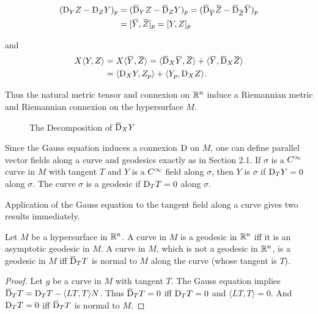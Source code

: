 \documentclass[../main]{subfiles}
\begin{document}
\[
\begin{aligned}
(\connection_Y Z - \connection_Z Y)_p &= (\covariant_Y Z-\covariant_Z Y)_p = (\covariant_{\xoverline{Y}}  \xoverline{Z} - \covariant_{\xoverline{Z}} \xoverline{Y})_p\\
&= [ \xoverline{Y}, \xoverline{Z} ]_p = [Y, Z]_p
\end{aligned}
\]

and
\[
\begin{aligned}
X\langle Y, Z\rangle &=X\langle\xoverline{Y}, \xoverline{Z}\rangle=\langle\covariant_{X} \xoverline{Y}, \xoverline{Z}\rangle+\langle\xoverline{Y}, \covariant_{X} \xoverline{Z}\rangle\\
&= \langle \connection_{X} Y, Z_{p}\rangle+\langle Y_{p}, \connection_{X} Z\rangle .
\end{aligned}
\]

Thus the natural metric tensor and connexion on $\mathbb{R}^n$ induce a Riemannian metric and Riemannian connexion on the hypersurface $M$.

\begin{figure}[ht]
    \centering
    \caption{The Decomposition of $\covariant_XY$}
    \label{fig:the-decomposition-of-dxy}
\end{figure}




Since the Gauss equation induces a connexion $\mathrm{D}$ on $M$, one can define parallel vector fields along a curve and geodesics exactly as in Section 2.1. If $\sigma$ is a $C^\infty$ curve in $M$ with tangent $T$ and $Y$ is a $C^\infty$ field along $\sigma$, then $Y$ is  $\sigma$ if $\mathrm{D}_{T} Y=0$ along $\sigma$. The curve $\sigma$ is a geodesic if $\mathrm{D}_{T} T=0$ along $\sigma$.

Application of the Gauss equation to the tangent field along a curve gives two results immediately.

\begin{theorem} \label{thm:ch2.3.1}
Let $M$ be a hypersurface in $\mathbb{R}^n$. A curve in $M$ is a geodesic in $\mathbb{R}^n$ iff it is an asymptotic geodesic in $M$. A curve in $M$, which is not a geodesic in $\mathbb{R}^n$, is a geodesic in $M$ iff $\covariant_T T$ is normal to $M$ along the curve (whose tangent is $T$).
\end{theorem}

\begin{proof}  Let $g$ be a curve in $M$ with tangent $T$. The Gauss equation implies $\covariant_T T = \connection_T T - \langle L T, T\rangle N$. Thus $\covariant_T T=0$ iff $\mathrm{D}_T T = 0$ and $\langle L T, T\rangle=0$. And $\mathrm{D}_T T=0$ iff $\covariant_T T$ is normal to $M$.
\end{proof}
\end{document}
